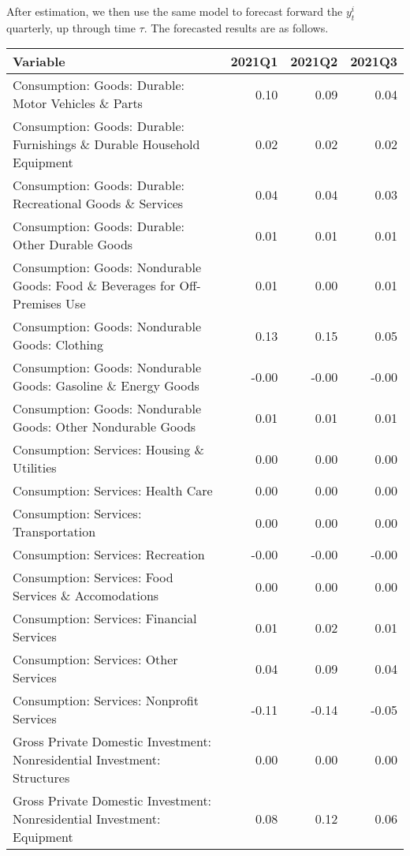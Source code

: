\documentclass[11pt, letterpaper]{article}\usepackage[]{graphicx}\usepackage[]{color}
\begin{document}
After estimation, we then use the same model to forecast forward the $y^i_t$ quarterly, up through time $\tau$. 
The forecasted results are as follows.
\begin{table}[H]
\centering
\begingroup\scriptsize
\begin{tabular}{lrrr}
  \hline
Variable & 2021Q1 & 2021Q2 & 2021Q3 \\ 
  \hline
Consumption: Goods: Durable: Motor Vehicles \& Parts & 0.10 & 0.09 & 0.04 \\ 
  Consumption: Goods: Durable: Furnishings \& Durable Household Equipment & 0.02 & 0.02 & 0.02 \\ 
  Consumption: Goods: Durable: Recreational Goods \& Services & 0.04 & 0.04 & 0.03 \\ 
  Consumption: Goods: Durable: Other Durable Goods & 0.01 & 0.01 & 0.01 \\ 
  Consumption: Goods: Nondurable Goods: Food \& Beverages for Off-Premises Use & 0.01 & 0.00 & 0.01 \\ 
  Consumption: Goods: Nondurable Goods: Clothing & 0.13 & 0.15 & 0.05 \\ 
  Consumption: Goods: Nondurable Goods: Gasoline \& Energy Goods & -0.00 & -0.00 & -0.00 \\ 
  Consumption: Goods: Nondurable Goods: Other Nondurable Goods & 0.01 & 0.01 & 0.01 \\ 
  Consumption: Services: Housing \& Utilities & 0.00 & 0.00 & 0.00 \\ 
  Consumption: Services: Health Care & 0.00 & 0.00 & 0.00 \\ 
  Consumption: Services: Transportation & 0.00 & 0.00 & 0.00 \\ 
  Consumption: Services: Recreation & -0.00 & -0.00 & -0.00 \\ 
  Consumption: Services: Food Services \& Accomodations & 0.00 & 0.00 & 0.00 \\ 
  Consumption: Services: Financial Services & 0.01 & 0.02 & 0.01 \\ 
  Consumption: Services: Other Services & 0.04 & 0.09 & 0.04 \\ 
  Consumption: Services: Nonprofit Services & -0.11 & -0.14 & -0.05 \\ 
  Gross Private Domestic Investment: Nonresidential Investment: Structures & 0.00 & 0.00 & 0.00 \\ 
  Gross Private Domestic Investment: Nonresidential Investment: Equipment & 0.08 & 0.12 & 0.06 \\ 

\end{tabular}
\end{table}
\end{document}
